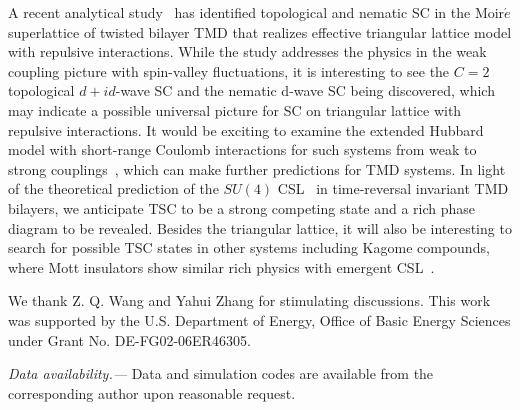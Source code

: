 \documentclass[aps,prx,reprint,superscriptaddress,showpacs]{revtex4-2}
\begin{document}
A recent analytical study~\cite{schrade2021nematic} has identified  topological and nematic SC  in the Moir$\acute{e}$ superlattice of twisted bilayer TMD that realizes effective triangular lattice  model with repulsive interactions. 
While the study addresses the physics in the weak coupling picture with spin-valley fluctuations, it is interesting  to see the  $C=2$ topological $d+id$-wave SC and the nematic d-wave SC being discovered, which may  indicate a possible universal picture for SC on triangular lattice with repulsive interactions. It would be exciting to examine the extended Hubbard model with short-range Coulomb interactions for such systems from weak to strong couplings~\cite{arovas2022hubbard}, which can make further predictions for TMD systems. In light of the theoretical prediction of the $SU(4)$ CSL~\cite{zhang20214} in time-reversal invariant TMD bilayers, we anticipate TSC to be a strong competing state and a rich phase diagram to be revealed. Besides the triangular lattice, it will also be interesting to search for possible TSC states in other systems including  Kagome compounds, where 
Mott insulators show similar rich physics  with emergent CSL~\cite{gong2014}.


\begin{acknowledgments}
We thank Z. Q. Wang and Yahui Zhang for stimulating discussions. 
This work was supported by  the U.S. Department of Energy, Office of Basic Energy Sciences under Grant No. DE-FG02-06ER46305. 
\end{acknowledgments}

\textit{Data availability.---}
Data and simulation codes are available from the corresponding author upon reasonable request.





%

\end{document}
